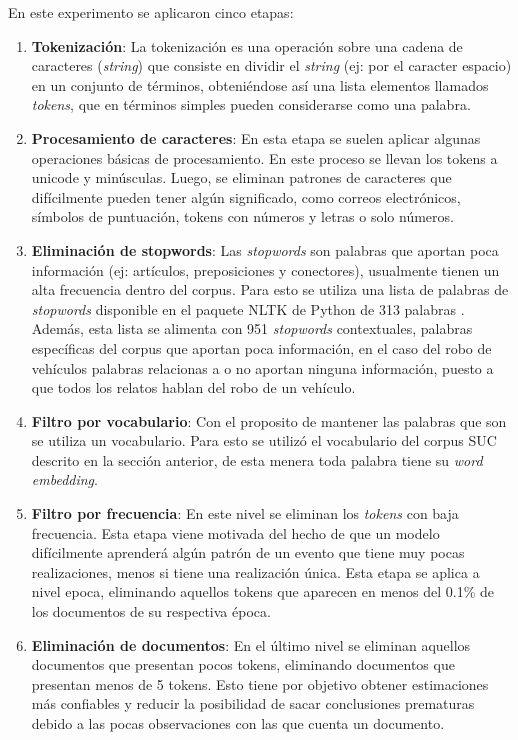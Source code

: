 En este experimento se aplicaron cinco etapas:
\begin{enumerate}
\item \textbf{Tokenización}: La tokenización es una operación sobre una cadena de caracteres (\textit{string}) que consiste en dividir el \textit{string} (ej: por el caracter espacio) en un conjunto de términos, obteniéndose así una lista elementos llamados \textit{tokens}, que en términos simples pueden considerarse como una palabra.
\item \textbf{Procesamiento de caracteres}: En esta etapa se suelen aplicar algunas operaciones básicas de procesamiento. En este proceso se llevan los tokens a unicode y minúsculas. Luego, se eliminan patrones de caracteres que difícilmente pueden tener algún significado, como correos electrónicos, símbolos de puntuación, tokens con números y letras o solo números. 
\item \textbf{Eliminación de stopwords}: Las \textit{stopwords} \citep{wilbur1992automatic} son palabras que aportan poca información (ej: artículos, preposiciones y conectores), usualmente tienen un alta frecuencia dentro del corpus. Para esto se utiliza una lista de palabras de \textit{stopwords} disponible en el paquete NLTK de Python de 313 palabras \citep{bird2009natural}. Además, esta lista se alimenta con 951 \textit{stopwords} contextuales, palabras específicas del corpus que aportan poca información, en el caso del robo de vehículos palabras relacionas a  o  no aportan ninguna información, puesto a que todos los relatos hablan del robo de un vehículo. 
\item \textbf{Filtro por vocabulario}: Con el proposito de mantener las palabras que son  se utiliza un vocabulario. Para esto se utilizó el vocabulario del corpus SUC descrito en la sección anterior, de esta menera toda palabra tiene su \textit{word embedding}. 
\item \textbf{Filtro por frecuencia}: En este nivel se eliminan los \textit{tokens} con baja frecuencia. Esta etapa viene motivada del hecho de que un modelo difícilmente aprenderá algún patrón de un evento que tiene muy pocas realizaciones, menos si tiene una realización única. Esta etapa se aplica a nivel epoca, eliminando aquellos tokens que aparecen en menos del 0.1\% de los documentos de su respectiva época.
\item \textbf{Eliminación de documentos}: En el último nivel se eliminan aquellos documentos que presentan pocos tokens, eliminando documentos que presentan menos de 5 tokens. Esto tiene por objetivo obtener estimaciones más confiables y reducir la posibilidad de sacar conclusiones prematuras debido a las pocas observaciones con las que cuenta un documento. 
\end{enumerate}

